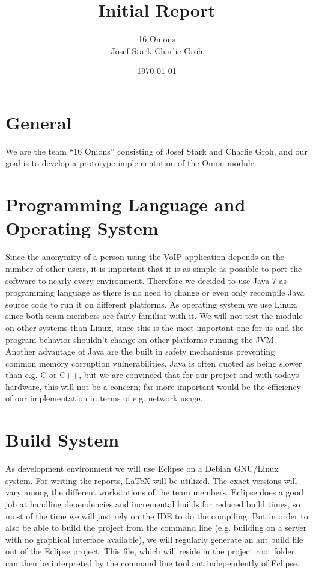 \documentclass{article}
\begin{document}
\title{\Huge Initial Report \normalsize}
\date{\today}
\author{\LARGE 16 Onions \normalsize \\[5pt] Josef Stark \hspace{20pt} Charlie Groh}
\maketitle
\let\thefootnote\relax{}

\section{General}
We are the team ``16 Onions'' consisting of Josef Stark and Charlie Groh,
and our goal is to develop a prototype implementation of the Onion module.

\section{Programming Language and Operating System}
Since the anonymity of a person using the VoIP application depends on the
number of other users, it is important that it is as simple as possible to port
the software to nearly every environment. Therefore we decided to use Java 7
as programming language as there is no need to change or even only recompile Java source code to run it on different platforms. As operating system we use Linux, since both team members are fairly familiar with it. We will not
test the module on other systems than Linux, since this is the most important one for us and the program behavior shouldn't change on other platforms running the JVM. Another advantage of Java are the built in safety mechanisms preventing common memory corruption vulnerabilities. 
Java is often quoted as being slower than e.g. C or C++, but we are convinced that for our project and with todays hardware, this will not be a concern; far more important would be the efficiency of our implementation in terms of e.g. network usage.

\section{Build System}
As development environment we will use Eclipse on a Debian GNU/Linux system. For
writing the reports, LaTeX will be utilized. The exact versions will vary among
the different workstations of the team members.
Eclipse does a good job at handling dependencies and incremental builds for reduced build times, so most of the time we will just rely on the IDE to do the compiling. But in order to also be able to build the project from the command line (e.g. building on a server with no graphical interface available), we will regularly generate an ant build file out of the Eclipse project. This file, which will reside in the project root folder, can then be interpreted by the command line tool ant independently of Eclipse.
\end{document}
